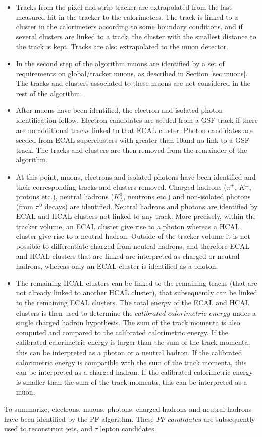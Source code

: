 \begin{itemize}
\item Tracks from the pixel and strip tracker are extrapolated from the last measured hit in the tracker to the calorimeters. 
The track is linked to a cluster in the calorimeters according to some boundary conditions, and if several clusters are linked to a track, the cluster with the smallest distance to the track is kept. 
Tracks are also extrapolated to the muon detector. 
\item In the second step of the algorithm muons are identified by a set of requirements on global/tracker muons, as described in Section \ref{sec:muons}. 
The tracks and clusters associated to these muons are not considered in the rest of the algorithm. 
\item After muons have been identified, the electron and isolated photon identification follow. 
Electron candidates are seeded from a GSF track if there are no additional tracks linked to that ECAL cluster. 
Photon candidates are seeded from ECAL superclusters with \ET greater than 10\GeV and no link to a GSF track.
The tracks and clusters are then removed from the remainder of the algorithm. 
\item At this point, muons, electrons and isolated photons have been identified and their corresponding tracks and clusters removed. 
Charged hadrons ($\pi^{\pm}$, $K^{\pm}$, protons etc.), neutral hadrons ($K_{L}^{0}$, neutrons etc.) and non-isolated photons (from $\pi^{0}$ decays) are identified. 
Neutral hadrons and photons are identified by ECAL and HCAL clusters not linked to any track. 
More precisely, within the tracker volume, an ECAL cluster give rise to a photon whereas a HCAL cluster give rise to a neutral hadron. 
Outside of the tracker volume it is not possible to differentiate charged from neutral hadrons, and therefore ECAL and HCAL clusters that are linked are interpreted as charged or neutral hadrons, whereas only an ECAL cluster is identified as a photon. 
\item The remaining HCAL clusters can be linked to the remaining tracks (that are not already linked to another HCAL cluster), that subsequently can be linked to the remaining ECAL clusters. 
The total energy of the ECAL and HCAL clusters is then used to determine the $calibrated$ $calorimetric$ $energy$ under a single charged hadron hypothesis. 
The sum of the track momenta is also computed and compared to the calibrated calorimetric energy. 
If the calibrated calorimetric energy is larger than the sum of the track momenta, this can be interpreted as a photon or a neutral hadron. 
If the calibrated calorimetric energy is compatible with the sum of the track momenta, this can be interpreted as a charged hadron. 
If the calibrated calorimetric energy is smaller than the sum of the track momenta, this can be interpreted as a muon. 
\end{itemize}
To summarize; electrons, muons, photons, charged hadrons and neutral hadrons have been identified by the PF algorithm. 
These $PF$ $candidates$ are subsequently used to reconstruct jets, \ptmiss and $\tau$ lepton candidates.   

